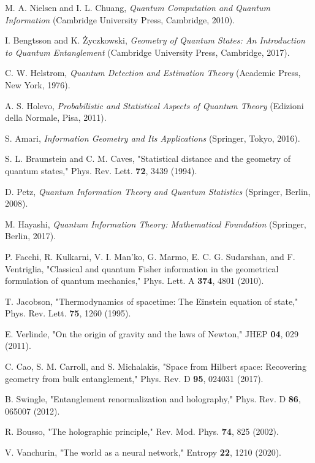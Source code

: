 \documentclass[12pt,a4paper]{article}
\begin{document}
\begin{thebibliography}{99}

M. A. Nielsen and I. L. Chuang, \textit{Quantum Computation and Quantum Information} (Cambridge University Press, Cambridge, 2010).

I. Bengtsson and K. Życzkowski, \textit{Geometry of Quantum States: An Introduction to Quantum Entanglement} (Cambridge University Press, Cambridge, 2017).

C. W. Helstrom, \textit{Quantum Detection and Estimation Theory} (Academic Press, New York, 1976).

A. S. Holevo, \textit{Probabilistic and Statistical Aspects of Quantum Theory} (Edizioni della Normale, Pisa, 2011).

S. Amari, \textit{Information Geometry and Its Applications} (Springer, Tokyo, 2016).

S. L. Braunstein and C. M. Caves, "Statistical distance and the geometry of quantum states," Phys. Rev. Lett. \textbf{72}, 3439 (1994).

D. Petz, \textit{Quantum Information Theory and Quantum Statistics} (Springer, Berlin, 2008).

M. Hayashi, \textit{Quantum Information Theory: Mathematical Foundation} (Springer, Berlin, 2017).

P. Facchi, R. Kulkarni, V. I. Man'ko, G. Marmo, E. C. G. Sudarshan, and F. Ventriglia, "Classical and quantum Fisher information in the geometrical formulation of quantum mechanics," Phys. Lett. A \textbf{374}, 4801 (2010).

T. Jacobson, "Thermodynamics of spacetime: The Einstein equation of state," Phys. Rev. Lett. \textbf{75}, 1260 (1995).

E. Verlinde, "On the origin of gravity and the laws of Newton," JHEP \textbf{04}, 029 (2011).

C. Cao, S. M. Carroll, and S. Michalakis, "Space from Hilbert space: Recovering geometry from bulk entanglement," Phys. Rev. D \textbf{95}, 024031 (2017).

B. Swingle, "Entanglement renormalization and holography," Phys. Rev. D \textbf{86}, 065007 (2012).

R. Bousso, "The holographic principle," Rev. Mod. Phys. \textbf{74}, 825 (2002).

V. Vanchurin, "The world as a neural network," Entropy \textbf{22}, 1210 (2020).

\end{thebibliography}
\end{document}

